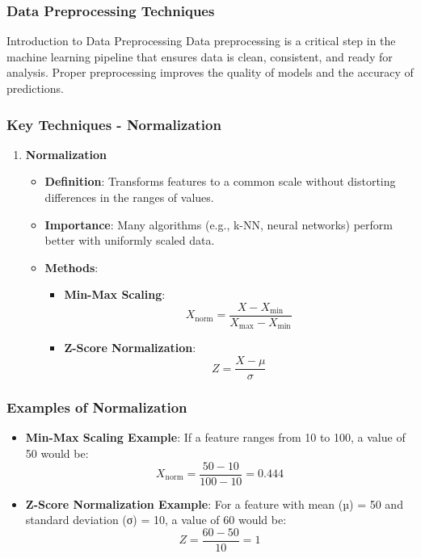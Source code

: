 \documentclass[aspectratio=169]{beamer}
\begin{document}
\begin{frame}[fragile]
    \frametitle{Data Preprocessing Techniques}
    \begin{block}{Introduction to Data Preprocessing}
        Data preprocessing is a critical step in the machine learning pipeline that ensures data is clean, consistent, and ready for analysis. 
        Proper preprocessing improves the quality of models and the accuracy of predictions.
    \end{block}
\end{frame}

\begin{frame}[fragile]
    \frametitle{Key Techniques - Normalization}
    \begin{enumerate}
        \item \textbf{Normalization}
        \begin{itemize}
            \item \textbf{Definition}: Transforms features to a common scale without distorting differences in the ranges of values.
            \item \textbf{Importance}: Many algorithms (e.g., k-NN, neural networks) perform better with uniformly scaled data.
            \item \textbf{Methods}:
            \begin{itemize}
                \item \textbf{Min-Max Scaling}:
                \begin{equation}
                X_{\text{norm}} = \frac{X - X_{\text{min}}}{X_{\text{max}} - X_{\text{min}}}
                \end{equation}
                \item \textbf{Z-Score Normalization}:
                \begin{equation}
                Z = \frac{X - \mu}{\sigma}
                \end{equation}
            \end{itemize}
        \end{itemize}
    \end{enumerate}
\end{frame}

\begin{frame}[fragile]
    \frametitle{Examples of Normalization}
    \begin{itemize}
        \item \textbf{Min-Max Scaling Example}: 
        If a feature ranges from 10 to 100, a value of 50 would be:
        \begin{equation}
        X_{\text{norm}} = \frac{50 - 10}{100 - 10} = 0.444
        \end{equation}
        
        \item \textbf{Z-Score Normalization Example}:
        For a feature with mean (µ) = 50 and standard deviation (σ) = 10, a value of 60 would be:
        \begin{equation}
        Z = \frac{60 - 50}{10} = 1
        \end{equation}
    \end{itemize}
\end{frame}
\end{document}
